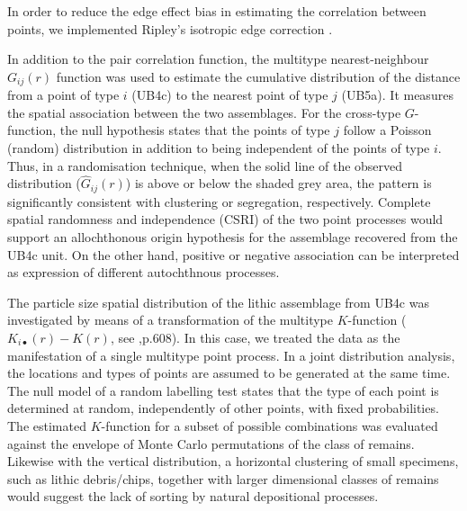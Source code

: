 \documentclass[preprint,authoryear,times]{elsarticle} %
\begin{document}
In order to reduce the edge effect bias in estimating the correlation between points, we implemented Ripley's isotropic edge correction \citep{Ohser1983,Ripley1988}. 

In addition to the pair correlation function, the multitype nearest-neighbour $G_{ij}(r)$ function was used to estimate the cumulative distribution of the distance from a point of type $i$ (UB4c) to the nearest point of type $j$ (UB5a). It measures the spatial association between the two assemblages. For the cross-type $G$-function, the null hypothesis states that the points of type $j$ follow a Poisson (random) distribution in addition to being independent of the points of type $i$. Thus, in a randomisation technique, when the solid line of the observed distribution ($\hat{G}_{ij}(r)$) is above or below the shaded grey area, the pattern is significantly consistent with clustering or segregation, respectively. Complete spatial randomness and independence (CSRI) of the two point processes would support an allochthonous origin hypothesis for the assemblage recovered from the UB4c unit. On the other hand, positive or negative association can be interpreted as expression of different autochthnous processes.

The particle size spatial distribution of the lithic assemblage from UB4c was investigated by means of a transformation of the multitype $K$-function ($K_{i\bullet}(r)-K(r)$, see \cite{spatstatBook},p.608). In this case, we treated the data as the manifestation of a single multitype point process. In a joint distribution analysis, the locations and types of points are assumed to be generated at the same time. The null model of a random labelling test states that the type of each point is determined at random, independently of other points, with fixed probabilities. The estimated $K$-function for a subset of possible combinations was evaluated against the envelope of Monte Carlo permutations of the class of remains. Likewise with the vertical distribution, a horizontal clustering of small specimens, such as lithic debris/chips, together with larger dimensional classes of remains would suggest the lack of sorting by natural depositional processes. %
\end{document}
